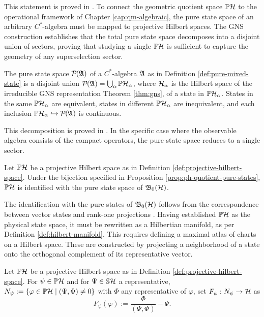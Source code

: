 \noindent This statement is proved in \cite[Section 2.5]{landsmanMathematicalTopicsClassical1998}. To connect the geometric quotient space $\PH$ to the operational framework of Chapter \ref{cap:qm-algebraic}, the pure state space of an arbitrary $C^*$-algebra must be mapped to projective Hilbert spaces. The GNS construction establishes that the total pure state space decomposes into a disjoint union of sectors, proving that studying a single $\PH$ is sufficient to capture the geometry of any superselection sector.

\begin{theorem}\label{thm:pure-state-decomposition}
	The pure state space $\mathcal{P}(\A)$ of a $C^*$-algebra $\mathfrak{A}$ as in Definition \ref{def:pure-mixed-state} is a disjoint union $\mathcal{P}(\A) = \bigcup_\alpha \PH_\alpha$, where $\H_\alpha$ is the Hilbert space of the irreducible GNS representation Theorem \ref{thm:gns}, of a state in $\PH_\alpha$. States in the same $\PH_\alpha$ are equivalent, states in different $\PH_\alpha$ are inequivalent, and each inclusion $\PH_\alpha \hookrightarrow \mathcal{P}(\A)$ is continuous.
\end{theorem}

This decomposition is proved in \cite[Theorem 2.5.4]{landsmanMathematicalTopicsClassical1998}. In the specific case where the observable algebra consists of the compact operators, the pure state space reduces to a single sector.

\begin{proposition}
	Let $\PH$ be a projective Hilbert space as in Definition \ref{def:projective-hilbert-space}. Under the bijection specified in Proposition \ref{prop:ph-quotient-pure-states}, $\PH$ is identified with the pure state space of $\mathfrak{B}_0(\H)$.
\end{proposition}

The identification with the pure states of $\mathfrak{B}_0(\H)$ follows from the correspondence between vector states and rank-one projections \cite[Corollary 2.5.3]{landsmanMathematicalTopicsClassical1998}. Having established $\PH$ as the physical state space, it must be rewritten as a Hilbertian manifold, as per Definition \ref{def:hilbert-manifold}. This requires defining a maximal atlas of charts on a Hilbert space. These are constructed by projecting a neighborhood of a state onto the orthogonal complement of its representative vector.

\begin{definition}
	\label{def:ph-chart}
	Let $\PH$ be a projective Hilbert space as in Definition \ref{def:projective-hilbert-space}. For $\psi\in\PH$ and for $\Psi\in \mathbb{S}\H$ a representative, 
	$N_\psi:=\{\varphi\in\PH\mid(\Psi,\Phi)\neq0\}$ with $\Phi$ any
	representative of $\varphi$, set $F_\psi : N_\psi\to\H$ as 
	\begin{equation}
		F_\psi(\varphi):=\frac{\Phi}{(\Psi,\Phi)}-\Psi. \label{eq:ph-chart}
	\end{equation}
\end{definition}


